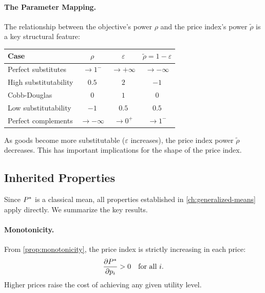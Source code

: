 \paragraph{The Parameter Mapping.}
The relationship between the objective's power $\rho$ and the price index's power $\tilde{\rho}$ is a key structural feature:

\begin{center}
\renewcommand{\arraystretch}{1.4}
\begin{tabular}{@{}lccc@{}}
\toprule
\textbf{Case} & $\rho$ & $\varepsilon$ & $\tilde{\rho} = 1 - \varepsilon$ \\
\midrule
Perfect substitutes & $\to 1^-$ & $\to +\infty$ & $\to -\infty$ \\
High substitutability & $0.5$ & $2$ & $-1$ \\
Cobb-Douglas & $0$ & $1$ & $0$ \\
Low substitutability & $-1$ & $0.5$ & $0.5$ \\
Perfect complements & $\to -\infty$ & $\to 0^+$ & $\to 1^-$ \\
\bottomrule
\end{tabular}
\end{center}

As goods become more substitutable ($\varepsilon$ increases), the price index power $\tilde{\rho}$ decreases. This has important implications for the shape of the price index.

\subsection{Inherited Properties}
\label{subsec:inherited-properties}

Since $P^{*}$ is a classical mean, all properties established in \cref{ch:generalized-means} apply directly. We summarize the key results.

\paragraph{Monotonicity.}
From \cref{prop:monotonicity}, the price index is strictly increasing in each price:
\begin{equation}
\frac{\partial P^{*}}{\partial p_i} > 0 \quad \text{for all } i.
\end{equation}
Higher prices raise the cost of achieving any given utility level.

